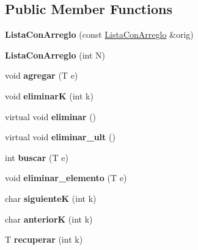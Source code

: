 \subsection*{Public Member Functions}
\begin{DoxyCompactItemize}
\item 
\hypertarget{class_lista_con_arreglo_ab7a22a8f04de9403d32a7431d4dd9627}{{\bfseries Lista\+Con\+Arreglo} (const \hyperlink{class_lista_con_arreglo}{Lista\+Con\+Arreglo} \&orig)}\label{class_lista_con_arreglo_ab7a22a8f04de9403d32a7431d4dd9627}

\item 
\hypertarget{class_lista_con_arreglo_a9541812a0019b76c6529184356913a59}{{\bfseries Lista\+Con\+Arreglo} (int N)}\label{class_lista_con_arreglo_a9541812a0019b76c6529184356913a59}

\item 
\hypertarget{class_lista_con_arreglo_a5336f6ef59e2cfaa008c4ad8cbee9f25}{void {\bfseries agregar} (T e)}\label{class_lista_con_arreglo_a5336f6ef59e2cfaa008c4ad8cbee9f25}

\item 
\hypertarget{class_lista_con_arreglo_acd8b8f484dc440dc64dc58cad375e7e4}{void {\bfseries eliminar\+K} (int k)}\label{class_lista_con_arreglo_acd8b8f484dc440dc64dc58cad375e7e4}

\item 
\hypertarget{class_lista_con_arreglo_a1d4ea3c3bbefa8d2c12ea520e12f5f9c}{virtual void {\bfseries eliminar} ()}\label{class_lista_con_arreglo_a1d4ea3c3bbefa8d2c12ea520e12f5f9c}

\item 
\hypertarget{class_lista_con_arreglo_aaf5d491456d3c0cfb3ed5fb657f254b2}{virtual void {\bfseries eliminar\+\_\+ult} ()}\label{class_lista_con_arreglo_aaf5d491456d3c0cfb3ed5fb657f254b2}

\item 
\hypertarget{class_lista_con_arreglo_af2fe968f5ec674cb9640e11a1bcaab99}{int {\bfseries buscar} (T e)}\label{class_lista_con_arreglo_af2fe968f5ec674cb9640e11a1bcaab99}

\item 
\hypertarget{class_lista_con_arreglo_a1b22a382b483cbd8eac40e1e72a0ff7c}{void {\bfseries eliminar\+\_\+elemento} (T e)}\label{class_lista_con_arreglo_a1b22a382b483cbd8eac40e1e72a0ff7c}

\item 
\hypertarget{class_lista_con_arreglo_a8a3d5d83291eeab7d9dbb2108a6942ea}{char {\bfseries siguiente\+K} (int k)}\label{class_lista_con_arreglo_a8a3d5d83291eeab7d9dbb2108a6942ea}

\item 
\hypertarget{class_lista_con_arreglo_a78e25313648f0d4f188f61f60d7ba4b6}{char {\bfseries anterior\+K} (int k)}\label{class_lista_con_arreglo_a78e25313648f0d4f188f61f60d7ba4b6}

\item 
\hypertarget{class_lista_con_arreglo_af880c9a6795cf9281f2a217d0a4b0c07}{T {\bfseries recuperar} (int k)}\label{class_lista_con_arreglo_af880c9a6795cf9281f2a217d0a4b0c07}

\end{DoxyCompactItemize}
